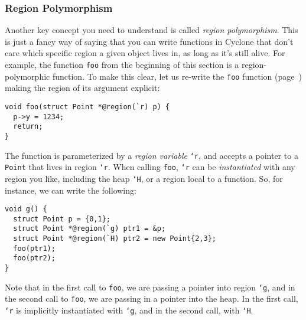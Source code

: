 


\subsubsection*{Region Polymorphism}

Another key concept you need to understand is called
\emph{region polymorphism}.  This is just a fancy way of saying
that you can write functions in Cyclone that don't care which
specific region a given object lives in, as long as it's still
alive.  For example, the function \texttt{foo} from the beginning
of this section is a region-polymorphic function.  To make this
clear, let us re-write the \texttt{foo} function
(page~\pageref{sec:tut-regions}) making the region of its argument explicit:
\begin{verbatim}
void foo(struct Point *@region(`r) p) {
  p->y = 1234;
  return;
}
\end{verbatim}
The function is parameterized by a \emph{region variable} \texttt{`r},
and accepts a pointer to a \texttt{Point} that lives in region
\texttt{`r}.  When calling \texttt{foo}, \texttt{`r} can be \emph{instantiated} with any
region you like, including the heap \texttt{`H}, or a region local to
a function. 
So, for instance, we can write the following:
\begin{verbatim}
void g() {
  struct Point p = {0,1};
  struct Point *@region(`g) ptr1 = &p;
  struct Point *@region(`H) ptr2 = new Point{2,3};
  foo(ptr1);
  foo(ptr2);
}
\end{verbatim}
Note that in the first call to \texttt{foo}, we are passing
a pointer into region \texttt{`g}, and in the second call to 
\texttt{foo}, we are passing in a pointer into the heap.  In
the first call, \texttt{`r} is implicitly instantiated with
\texttt{`g}, and in the second call, with \texttt{`H}.

